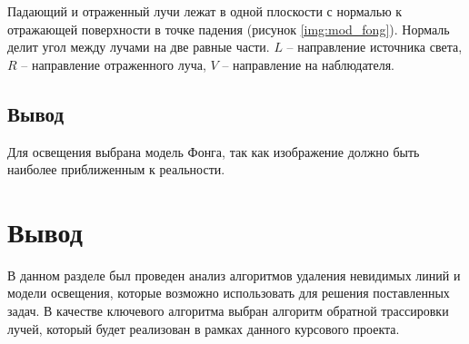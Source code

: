 Падающий и отраженный лучи лежат в одной плоскости с нормалью к отражающей поверхности в точке падения (рисунок \ref{img:mod_fong}). Нормаль делит угол между лучами на две равные части. $L$ – направление источника света, $R$ – направление отраженного луча, $V$ – направление на наблюдателя.

\subsection{Вывод}
Для освещения выбрана модель Фонга, так как изображение должно быть наиболее приближенным к реальности.

\section*{Вывод}
В данном разделе был проведен анализ алгоритмов удаления невидимых линий и модели освещения, которые возможно использовать для решения поставленных задач. В качестве ключевого алгоритма выбран алгоритм обратной трассировки лучей, который будет реализован в рамках данного курсового проекта.

